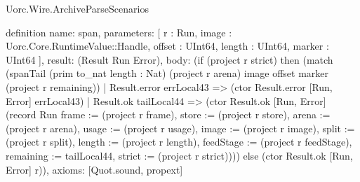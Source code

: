 \begin{lexlean}{Uorc.Wire.ArchiveParseScenarios}
\begin{semanticmodule}
definition{
  name: span,
  parameters: [
    r : Run,
    image : Uorc.Core.RuntimeValue::Handle,
    offset : UInt64,
    length : UInt64,
    marker : UInt64
  ],
  result: (Result Run Error),
  body: (if (project r strict) then (match (spanTail (prim to_nat length : Nat) (project r arena) image offset marker (project r remaining))
    | Result.error errLocal43 => (ctor Result.error [Run, Error] errLocal43)
    | Result.ok tailLocal44 => (ctor Result.ok [Run, Error] (record Run {frame := (project r frame), store := (project r store), arena := (project r arena), usage := (project r usage), image := (project r image), split := (project r split), length := (project r length), feedStage := (project r feedStage), remaining := tailLocal44, strict := (project r strict)}))) else (ctor Result.ok [Run, Error] r)),
  axioms: [Quot.sound, propext]
}


\end{semanticmodule}
\end{lexlean}
